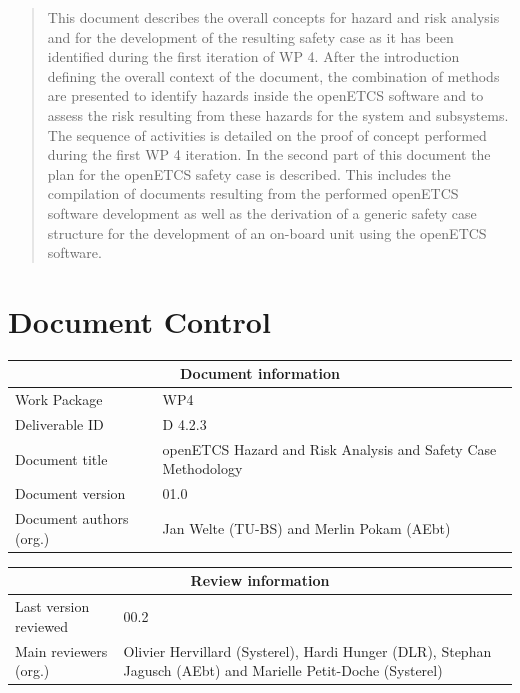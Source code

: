 \documentclass{template/openetcs_report}
\begin{document}



\begin{abstract}
This document describes the overall concepts for hazard and risk analysis and for the development of the resulting safety case as it has been identified during the first iteration of WP 4.
After the introduction defining the overall context of the document, the combination of methods are presented to identify hazards inside the openETCS software and to assess the risk resulting from these hazards for the system and subsystems. The sequence of activities is detailed on the proof of concept performed during the first WP 4 iteration. In the second part of this document the plan for the openETCS safety case is described. This includes the compilation of documents resulting from the performed openETCS software development as well as the derivation of a generic safety case structure for the development of an on-board unit using the openETCS software.
\end{abstract}

\maketitle
\tableofcontents
\listoffiguresandtables
\newpage

\chapter{Document Control}

\begin{tabular}{|p{4.4cm}|p{8.7cm}|}
\hline
\multicolumn{2}{|c|}{Document information} \\
\hline
Work Package &  WP4  \\
Deliverable ID & D 4.2.3\\
\hline
Document title & openETCS Hazard and Risk Analysis and Safety Case Methodology \\
Document version & 01.0 \\
Document authors (org.)  & Jan Welte (TU-BS) and Merlin Pokam (AEbt)\\
\hline
\end{tabular}

\begin{tabular}{|p{4.4cm}|p{8.7cm}|}
\hline
\multicolumn{2}{|c|}{Review information} \\
\hline
Last version reviewed & 00.2 \\
\hline
Main reviewers (org.) & Olivier Hervillard	(Systerel), Hardi Hunger (DLR), Stephan Jagusch (AEbt) and Marielle Petit-Doche (Systerel) \\
\hline
\end{tabular}
\end{document}
